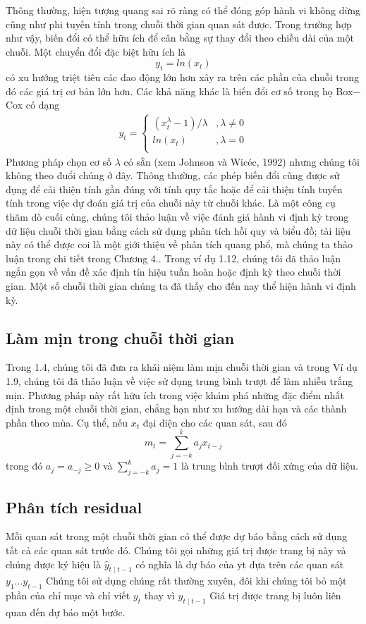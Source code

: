 \documentclass[12pt, a4paper,oneside]{book}
\theoremstyle{definition}
\begin{document}
Thông thường, hiện tượng quang sai rõ ràng có thể đóng góp hành vi không dừng cũng như phi tuyến tính trong chuỗi thời gian quan sát được. Trong trường hợp như vậy, biến đổi có thể hữu ích để cân bằng sự thay đổi theo chiều dài của một chuỗi. Một chuyển đổi đặc biệt hữu ích là
$$y_{t}=ln(x_{t})$$
có xu hướng triệt tiêu các dao động lớn hơn xảy ra trên các phần của chuỗi trong đó các giá trị cơ bản lớn hơn. Các khả năng khác là biến đổi cơ số trong họ Box$-$Cox có dạng
\begin{align*}
y_{t}=
\begin{cases} 
(x_{t}^{\lambda}-1)/\lambda&, \lambda\neq 0\\
ln(x_{t})&, \lambda=0\\
\end{cases}
\end{align*}
Phương pháp chọn cơ số $ \lambda $ có sẵn (xem Johnson và Wicéc, 1992) nhưng chúng tôi không theo đuổi chúng ở đây. Thông thường, các phép biến đổi cũng được sử dụng để cải thiện tính gần đúng với tính quy tắc hoặc để cải thiện tính tuyến tính trong việc dự đoán giá trị của chuỗi này từ chuỗi khác.
Là một công cụ thăm dò cuối cùng, chúng tôi thảo luận về việc đánh giá hành vi định kỳ trong dữ liệu chuỗi thời gian bằng cách sử dụng phân tích hồi quy và biểu đồ; tài liệu này có thể được coi là một giới thiệu về phân tích quang phổ, mà chúng ta thảo luận trong chi tiết trong Chương 4.. Trong ví dụ 1.12, chúng tôi đã thảo luận ngắn gọn về vấn đề xác định tín hiệu tuần hoàn hoặc định kỳ theo chuỗi thời gian. Một số chuỗi thời gian chúng ta đã thấy cho đến nay thể hiện hành vi định kỳ. 
\subsection{Làm mịn trong chuỗi thời gian}
Trong 1.4, chúng tôi đã đưa ra khái niệm làm mịn chuỗi thời gian và trong Ví dụ 1.9, chúng tôi đã thảo luận về việc sử dụng trung bình trượt để làm nhiễu trắng mịn. Phương pháp này rất hữu ích trong việc khám phá những đặc điểm nhất định trong một chuỗi thời gian, chẳng hạn như xu hướng dài hạn và các thành phần theo mùa. Cụ thể, nếu $ x_{t} $ đại diện cho các quan sát, sau đó
$$m_{t}= \sum_{j=-k}^{k} a_{j}x_{t-j}$$
trong đó $a_{j}=a_{-j}\geq 0$ và $\sum_{j=-k}^{k} a_{j}=1$ là trung bình trượt đối xứng của dữ liệu.
\subsection{Phân tích residual}
Mỗi quan sát trong một chuỗi thời gian có thể được dự báo bằng cách sử dụng tất cả các quan sát trước đó. Chúng tôi gọi những giá trị được trang bị này và chúng được ký hiệu là $\hat{y}_{t\mid t-1}$ có nghĩa là dự báo của yt dựa trên các quan sát $y_{1}...y_{t-1}$ Chúng tôi sử dụng chúng rất thường xuyên, đôi khi chúng tôi bỏ một phần của chỉ mục và chỉ viết $y_{t}$ thay vì $y_{t\mid t-1}$ Giá trị được trang bị luôn liên quan đến dự báo một bước.
\end{document}

